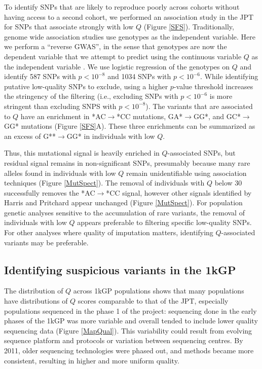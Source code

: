 \documentclass[9pt,lineno]{template}
\begin{document}
To identify SNPs that are likely to reproduce poorly across cohorts without having access to a second cohort, we performed an association study in the JPT for SNPs that associate strongly with low $Q$ (Figure \ref{SFS}).
Traditionally, genome wide association studies use genotypes as the independent variable. 
Here we perform a ``reverse GWAS'', in the sense that genotypes are now the dependent variable that we attempt to predict using the continuous variable $Q$ as the independent variable \citep{song2015testing}.
We use logistic regression of the genotypes on $Q$ and identify 587 SNPs with $p < 10^{-8}$ and 1034 SNPs with $ p < 10^{-6}$. 
While identifying putative low-quality SNPs to exclude, using a higher $p$-value threshold increases the stringency of the filtering (i.e., excluding SNPs with $ p < 10^{-6}$ is more stringent than excluding SNPS with $p < 10^{-8}$). 
The variants that are associated to $Q$ have an enrichment in *AC${\rightarrow}$*CC mutations, GA*${\rightarrow}$GG*, and GC*${\rightarrow}$GG* mutations (Figure \ref{SFS}A).
These three enrichments can be summarized as an excess of G**${\rightarrow}$GG* in individuals with low $Q$.

Thus, this mutational signal is heavily enriched in $Q$-associated SNPs, but residual signal remains in non-significant SNPs, presumably because many rare alleles found in individuals with low $Q$ remain unidentifiable using association techniques (Figure \ref{MutSpect}). The removal of individuals with $Q$ below 30 successfully removes the *AC${\rightarrow}$*CC signal, however other signals identified by Harris and Pritchard appear unchanged (Figure \ref{MutSpect}).
For population genetic analyses sensitive to the accumulation of rare variants, the removal of individuals with low $Q$ appears preferable to filtering specific low-quality SNPs. 
For other analyses where quality of imputation matters, identifying $Q$-associated variants may be preferable. 


\subsection{Identifying suspicious variants in the 1kGP}
The distribution of $Q$ across 1kGP populations shows that many populations have distributions of $Q$ scores comparable to that of the JPT, especially populations sequenced in the phase 1 of the project: sequencing done in the early phases of the 1kGP was more variable and overall tended to include lower quality sequencing data (Figure \ref{MapQual}).
This variability could result from evolving sequence platform and protocols or variation between sequencing centres. 
By 2011, older sequencing technologies were phased out, and methods became more consistent, resulting in higher and more uniform quality.
\end{document}

